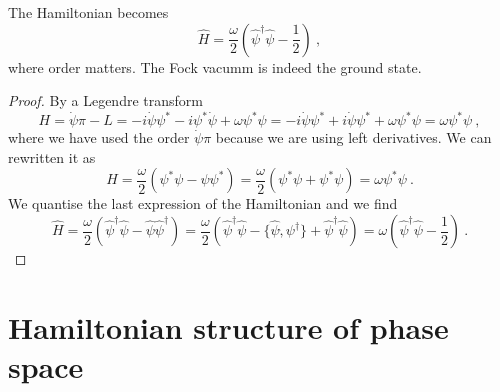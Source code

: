     The Hamiltonian becomes 
    \begin{equation*}
        \hat H = \frac{\omega}{2} (\hat \psi^\dagger \hat \psi - \frac{1}{2}) ~,
    \end{equation*}
    where order matters. The Fock vacumm is indeed the ground state.
    \begin{proof}
        By a Legendre transform 
        \begin{equation*}
            H = \dot \psi \pi - L = - i \dot \psi \psi^* - i \psi^* \dot \psi + \omega \psi^* \psi = - i \dot \psi \psi^* + i \dot \psi \psi^* + \omega \psi^* \psi = \omega \psi^* \psi ~,
        \end{equation*}
        where we have used the order $\dot \psi \pi$ because we are using left derivatives. We can rewritten it as 
        \begin{equation*}
            H = \frac{\omega}{2} (\psi^* \psi - \psi \psi^*) = \frac{\omega}{2} (\psi^* \psi + \psi^* \psi) = \omega \psi^* \psi ~.
        \end{equation*}
        We quantise the last expression of the Hamiltonian and we find 
        \begin{equation*}
            \hat H = \frac{\omega}{2} (\hat \psi^\dagger \hat \psi - \hat \psi \hat \psi^\dagger) = \frac{\omega}{2} (\hat \psi^\dagger \hat \psi - \{\hat \psi \hat, \psi^\dagger \}+ \hat \psi^\dagger \hat \psi) = \omega (\hat \psi^\dagger \hat \psi - \frac{1}{2}) ~.
        \end{equation*}
    \end{proof} 

\section{Hamiltonian structure of phase space}

